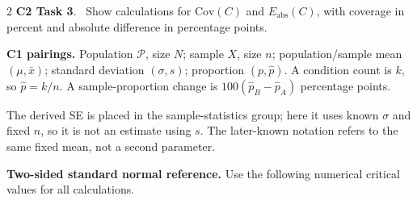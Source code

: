 \begin{multicols}{2}
\textbf{C2 Task 3}. \cTwoC\ Show calculations for $\mathrm{Cov}(C)$ and $E_{\mathrm{abs}}(C)$, with coverage in percent and absolute difference in percentage points. 

\endgroup

\columnbreak

\begingroup\small
\textbf{C1 pairings.} Population $\mathcal P$, size $N$; sample $X$, size $n$; population/sample mean $(\mu,\bar x)$; standard deviation $(\sigma,s)$; proportion $(p,\hat p)$. A condition count is $k$, so $\hat p=k/n$. A sample-proportion change is $100(\hat p_B-\hat p_A)$ percentage points.

The derived SE is placed in the sample-statistics group; here it uses known $\sigma$ and fixed $n$, so it is not an estimate using $s$. The later-known notation refers to the same fixed mean, not a second parameter.

\textbf{Two-sided standard normal reference.} Use the following numerical critical values for all calculations.
\par\noindent\begin{minipage}{\linewidth}
\begin{minipage}[t]{.49\linewidth}\vspace{0pt}
\end{minipage}\hfill
\begin{minipage}[t]{.49\linewidth}\vspace{0pt}
\end{minipage}
\end{minipage}\par


\end{multicols}
